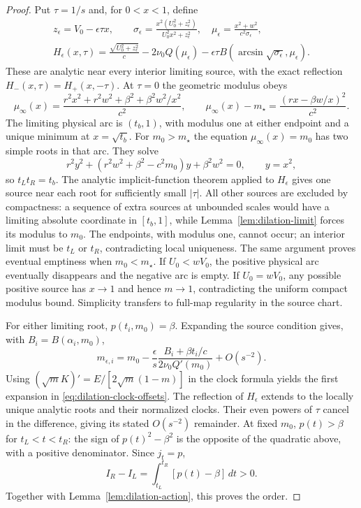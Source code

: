 \documentclass[11pt,a4paper]{article}
\theoremstyle{remark}\newtheorem{remark}[theorem]{Remark}
\begin{document}
\begin{proof}
Put $\tau=1/s$ and, for $0<x<1$, define
\begin{equation}\label{eq:dilation-residual}
 \begin{gathered}
 z_\epsilon=V_0-\epsilon\tau x,\qquad
 \sigma_\epsilon=\frac{x^2(U_0^2+z_\epsilon^2)}{U_0^2x^2+z_\epsilon^2},
 \quad \mu_\epsilon=\frac{x^2+w^2}{c^2\sigma_\epsilon},\\
 H_\epsilon(x,\tau)=\frac{\sqrt{U_0^2+z_\epsilon^2}}c
       -2\nu_0Q(\mu_\epsilon)
       -\epsilon\tau B(\arcsin\sqrt{\sigma_\epsilon},\mu_\epsilon).
 \end{gathered}
\end{equation}
These are analytic near every interior limiting source, with the exact
reflection $H_-(x,\tau)=H_+(x,-\tau)$. At $\tau=0$ the geometric
modulus obeys
\begin{equation}\label{eq:dilation-square}
 \mu_\infty(x)=\frac{r^2x^2+r^2w^2+\beta^2+\beta^2w^2/x^2}{c^2},
 \qquad
 \mu_\infty(x)-m_\star=\frac{(rx-\beta w/x)^2}{c^2}.
\end{equation}
The limiting physical arc is $(t_b,1)$, with modulus one at either
endpoint and a unique minimum at $x=\sqrt{t_b}$. For $m_0>m_\star$
the equation $\mu_\infty(x)=m_0$ has two simple roots in that arc.
They solve
\[
 r^2 y^2+(r^2w^2+\beta^2-c^2m_0)y+\beta^2w^2=0,
 \qquad y=x^2,
\]
so $t_Lt_R=t_b$. The analytic implicit-function theorem applied to
$H_\epsilon$ gives one source near each root for sufficiently small
$|\tau|$. All other sources are excluded by compactness: a sequence
of extra sources at unbounded scales would have a limiting absolute
coordinate in $[t_b,1]$, while Lemma~\ref{lem:dilation-limit} forces
its modulus to $m_0$. The endpoints, with modulus one, cannot occur;
an interior limit must be $t_L$ or $t_R$, contradicting local uniqueness.
The same argument proves eventual emptiness when $m_0<m_\star$.
If $U_0<wV_0$, the positive physical arc eventually disappears and the
negative arc is empty. If $U_0=wV_0$, any possible positive source has
$x\to1$ and hence $m\to1$, contradicting the uniform compact modulus
bound. Simplicity transfers to full-map regularity in the source chart.

For either limiting root, $p(t_i,m_0)=\beta$. Expanding the source
condition gives, with $B_i=B(\alpha_i,m_0)$,
\[
 m_{\epsilon,i}=m_0-\frac{\epsilon}{s}
       \frac{B_i+\beta t_i/c}{2\nu_0Q'(m_0)}+O(s^{-2}).
\]
Using $(\sqrt m K)'=E/[2\sqrt m(1-m)]$ in the clock formula yields
the first expansion in \eqref{eq:dilation-clock-offsets}.
The reflection of $H_\epsilon$ extends to the locally unique analytic
roots and their normalized clocks. Their even powers of $\tau$ cancel
in the difference, giving its stated $O(s^{-2})$ remainder.
At fixed $m_0$, $p(t)>\beta$ for $t_L<t<t_R$: the sign of
$p(t)^2-\beta^2$ is the opposite of the quadratic above, with a
positive denominator. Since $j_t=p$,
\[
 I_R-I_L=\int_{t_L}^{t_R}[p(t)-\beta]\,dt>0.
\]
Together with Lemma~\ref{lem:dilation-action}, this proves the order.
\end{proof}
\end{document}
